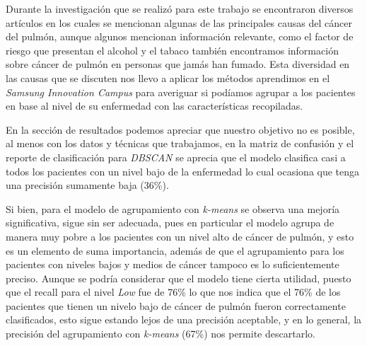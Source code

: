 Durante la investigación que se realizó para este trabajo se encontraron diversos artículos en los cuales se mencionan algunas de las principales causas del cáncer del pulmón, aunque algunos mencionan información relevante, como el factor de riesgo que presentan el alcohol y el tabaco también encontramos información sobre cáncer de pulmón en personas que jamás han fumado. Esta diversidad en las causas que se discuten nos llevo a aplicar los métodos aprendimos en el \textit{Samsung Innovation Campus} para averiguar si podíamos agrupar a los pacientes en base al nivel de su enfermedad con las características recopiladas.

En la sección de resultados podemos apreciar que nuestro objetivo no es posible, al menos con los datos y técnicas que trabajamos, en la matriz de confusión y el reporte de clasificación para \textit{DBSCAN} se aprecia que el modelo clasifica casi a todos los pacientes con un nivel bajo de la enfermedad lo cual ocasiona que tenga una precisión sumamente baja (36\%). 

Si bien, para el modelo de agrupamiento con \textit{k-means} se observa una mejoría significativa, sigue sin ser adecuada, pues en particular el modelo agrupa de manera muy pobre a los pacientes con un nivel alto de cáncer de pulmón, y esto es un elemento de suma importancia, además de que el agrupamiento para los pacientes con niveles bajos y medios de cáncer tampoco es lo suficientemente preciso. Aunque se podría considerar que el modelo tiene cierta utilidad, puesto que el recall para el nivel \textit{Low} fue de 76\% lo que nos indica que el 76\% de los pacientes que tienen un nivelo bajo de cáncer de pulmón fueron correctamente clasificados, esto sigue estando lejos de una precisión aceptable, y en lo general, la precisión del agrupamiento con \textit{k-means} (67\%) nos permite descartarlo. 
